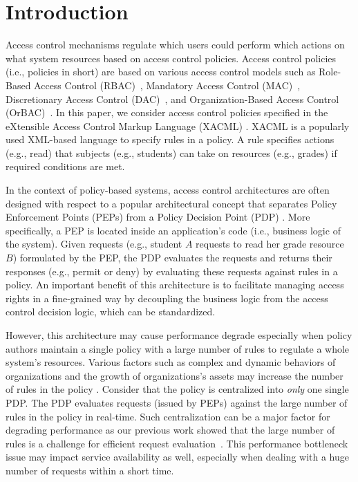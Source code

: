 \section{Introduction} \label{sec:introduction}

Access control mechanisms regulate which users
could perform which actions on what system resources based on access control policies.
Access control policies (i.e., policies in short) are based on various access control models such as Role-Based Access Control (RBAC)~\cite{ferraiolo:rbac}, Mandatory Access Control (MAC)~\cite{mac}, Discretionary Access Control (DAC)~\cite{dac}, and Organization-Based Access Control (OrBAC)~\cite{orbac}.
In this paper, we consider access control policies specified in 
the eXtensible Access Control Markup Language (XACML) \cite{sunxacml}. XACML is a popularly used XML-based language to specify rules 
in a policy. A rule specifies actions (e.g., read) that subjects (e.g., students) can take on resources (e.g., grades) if required conditions are met.

In the context of policy-based systems, access control architectures are often designed with respect to a popular
architectural concept that separates Policy Enforcement Points (PEPs) from a Policy Decision Point (PDP) \cite{separation}. More specifically, a PEP is located inside an application's code (i.e., business logic of the system).
Given requests (e.g., student $A$ requests to read her grade resource $B$) formulated by the PEP, the PDP evaluates the requests and returns their responses (e.g., permit or deny) by evaluating these requests 
against rules in a policy. An important benefit of this architecture is to facilitate managing access rights in a fine-grained way by 
decoupling the business logic from the access control decision logic, which can be standardized. 

However, this architecture may cause performance degrade
especially when policy authors maintain a single policy with a large number of rules to regulate a whole system's resources.
Various factors such as complex and dynamic behaviors of organizations and the growth of organizations's assets may increase the 
number of rules in the policy \cite{policymanagement}. 
Consider that the policy is centralized into \emph{only} one single PDP.
The PDP evaluates requests (issued by PEPs) against
the large number of rules in the policy in real-time.
Such centralization can be a major factor for degrading performance as our previous work showed that the large number of rules is a challenge for efficient request evaluation~\cite{Xengine}.
This performance bottleneck issue may impact service 
availability as well, especially when dealing with a huge number of requests within a short time.


